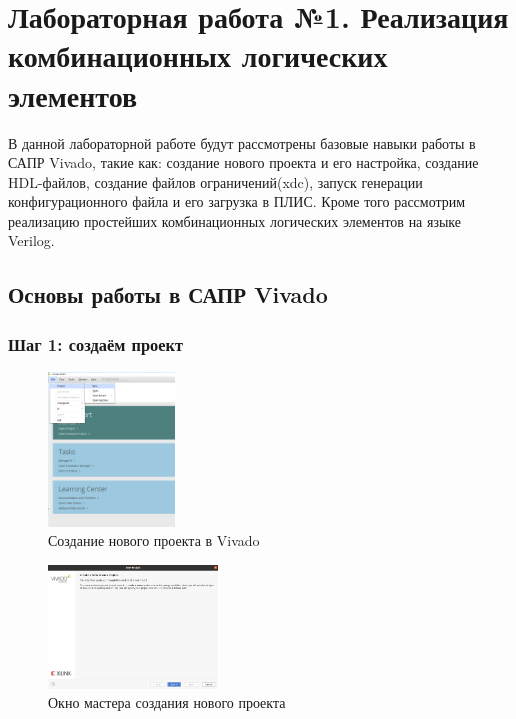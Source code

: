 \chapter{Лабораторная работа №1. Реализация комбинационных логических элементов}

В данной лабораторной работе будут рассмотрены базовые навыки работы в САПР Vivado, такие как: создание нового проекта и 
его настройка, создание HDL-файлов, создание файлов ограничений(xdc), запуск генерации конфигурационного файла и его загрузка в ПЛИС.
Кроме того рассмотрим реализацию простейших комбинационных логических элементов на языке Verilog.

\section{Основы работы в САПР Vivado}

\subsection{Шаг 1: создаём проект}

\begin{figure}[!ht]
	\centering
	\includegraphics[width=0.3\textwidth]{image/m_3.png}
	\caption{Создание нового проекта в Vivado}
	\label{l1_new_prj}
\end{figure}

\begin{figure}[!ht]
	\centering
	\includegraphics[width=0.4\textwidth]{image/2}
	\caption{Окно мастера создания нового проекта}
	\label{l1_master}
\end{figure}

